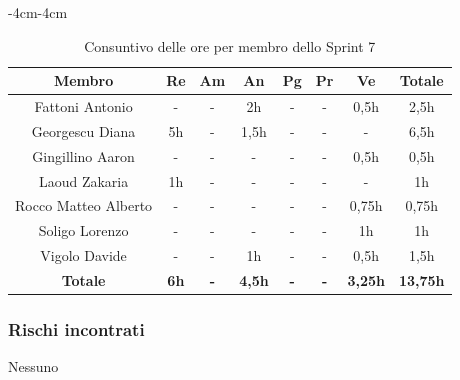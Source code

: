 \documentclass[a4paper,12pt]{article}
\begin{document}
\begin{table}[H]
    \begin{adjustwidth}{-4cm}{-4cm}
    \centering
    \begin{tabular}{|c|c|c|c|c|c|c|c|}
        \hline
        \textbf{Membro} & \textbf{Re} & \textbf{Am} & \textbf{An} & \textbf{Pg} & \textbf{Pr} & \textbf{Ve} & \textbf{Totale} \\
        \hline
        Fattoni Antonio      & -  & - & 2h & - & - & 0,5h & 2,5h \\
        \hline
        Georgescu Diana      & 5h & - & 1,5h & - & - & - & 6,5h \\
        \hline
        Gingillino Aaron     & -  & - & -    & - & - & 0,5h & 0,5h \\
        \hline
        Laoud Zakaria        & 1h  & - & -    & - & - & - & 1h \\
        \hline
        Rocco Matteo Alberto & -  & - & -    & - & - & 0,75h & 0,75h \\
        \hline
        Soligo Lorenzo       & -  & - & -    & - & - & 1h & 1h \\
        \hline
        Vigolo Davide        & -  & - & 1h    & - & - & 0,5h & 1,5h \\
        \hline
        \textbf{Totale} & \textbf{6h} & \textbf{-} & \textbf{4,5h} & \textbf{-} & \textbf{-} & \textbf{3,25h} & \textbf{13,75h} \\
        \hline
    \end{tabular}
    \caption{Consuntivo delle ore per membro dello Sprint 7}
    \end{adjustwidth}
\end{table}

\subsubsection{Rischi incontrati}
Nessuno
\end{document}
